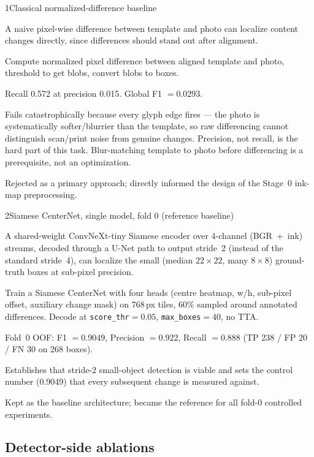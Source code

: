 \begin{explog}{1}{Classical normalized-difference baseline}
\item[Hypothesis] A naive pixel-wise difference between template and photo can localize content changes directly, since differences should stand out after alignment.
\item[Method] Compute normalized pixel difference between aligned template and photo, threshold to get blobs, convert blobs to boxes.
\item[Result] Recall 0.572 at precision 0.015. Global F1 $=0.0293$.
\item[Inference] Fails catastrophically because every glyph edge fires --- the photo is systematically softer/blurrier than the template, so raw differencing cannot distinguish scan/print noise from genuine changes. Precision, not recall, is the hard part of this task. Blur-matching template to photo before differencing is a prerequisite, not an optimization.
\item[Verdict] Rejected as a primary approach; directly informed the design of the Stage~0 ink-map preprocessing.
\end{explog}


\begin{explog}{2}{Siamese CenterNet, single model, fold 0 (reference baseline)}
\item[Hypothesis] A shared-weight ConvNeXt-tiny Siamese encoder over 4-channel (BGR~+~ink) streams, decoded through a U-Net path to output stride~2 (instead of the standard stride~4), can localize the small (median $22\times22$, many $8\times8$) ground-truth boxes at sub-pixel precision.
\item[Method] Train a Siamese CenterNet with four heads (centre heatmap, w/h, sub-pixel offset, auxiliary change mask) on $768$\,px tiles, 60\% sampled around annotated differences. Decode at \texttt{score\_thr}$=0.05$, \texttt{max\_boxes}$=40$, no TTA.
\item[Result] Fold~0 OOF: F1 $=0.9049$, Precision $=0.922$, Recall $=0.888$ (TP 238 / FP 20 / FN 30 on 268 boxes).
\item[Inference] Establishes that stride-2 small-object detection is viable and sets the control number (0.9049) that every subsequent change is measured against.
\item[Verdict] Kept as the baseline architecture; became the reference for all fold-0 controlled experiments.
\end{explog}


\subsection{Detector-side ablations}

